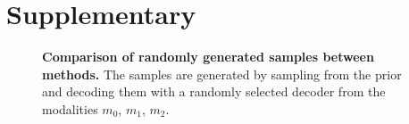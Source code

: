 \section{Supplementary}
%

\begin{figure}[h!]
    \centering
    \caption{\textbf{Comparison of randomly generated samples between methods.} The samples are generated by sampling from the prior and decoding them with a randomly selected decoder from the modalities $m_0$, $m_1$, $m_2$.
    }


\end{figure}